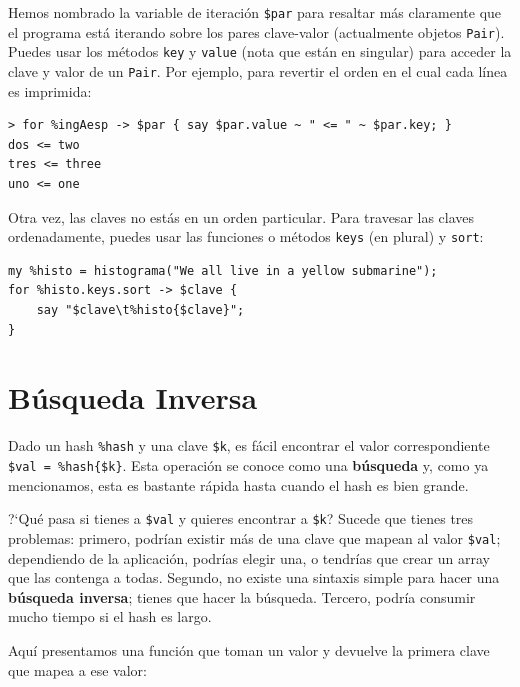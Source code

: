 Hemos nombrado la variable de iteración \verb|$par| para
resaltar más claramente que el programa está iterando
sobre los pares clave-valor (actualmente objetos \verb|Pair|).
Puedes usar los métodos {\tt key} y {\tt value} (nota que
están en singular) para acceder
la clave y valor de un \verb|Pair|. Por ejemplo, para revertir
el orden en el cual cada línea es imprimida:

\begin{lstlisting}
> for %ingAesp -> $par { say $par.value ~ " <= " ~ $par.key; }
dos <= two
tres <= three
uno <= one
\end{lstlisting}

Otra vez, las claves no estás en un orden particular. Para
travesar las claves ordenadamente, puedes usar las funciones
o métodos {\tt keys} (en plural) y {\tt sort}:

\begin{lstlisting}
my %histo = histograma("We all live in a yellow submarine");
for %histo.keys.sort -> $clave {
    say "$clave\t%histo{$clave}";
}
\end{lstlisting}



\section{Búsqueda Inversa}
\label{raise}

Dado un hash \verb|%hash| y una clave \verb|$k|, es fácil 
encontrar el valor correspondiente \verb|$val = %hash{$k}|.
Esta operación se conoce como una {\bf búsqueda} y, como ya
mencionamos, esta es bastante rápida hasta cuando el hash
es bien grande.

?`Qué pasa si tienes a \verb|$val| y quieres encontrar a \verb|$k|?
Sucede que tienes tres problemas: primero, podrían existir más
de una clave que mapean al valor \verb|$val|; dependiendo de
la aplicación, podrías elegir una, o tendrías que crear un array 
que las contenga a todas. Segundo, no existe una sintaxis simple
para hacer una {\bf búsqueda inversa}; tienes que hacer la búsqueda.
Tercero, podría consumir mucho tiempo si el hash es largo.

Aquí presentamos una función que toman un valor y devuelve
la primera clave que mapea a ese valor:

